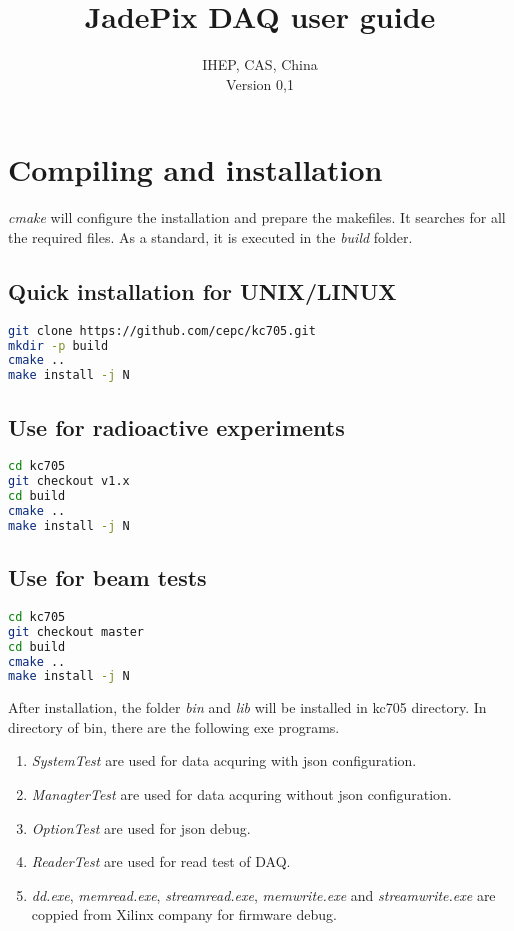 \documentclass[12pt,a4paper]{article}
\title{JadePix DAQ user guide}
\author{IHEP, CAS, China \\
	\small{Version 0,1}
}
\begin{document}
\maketitle

\newpage

\tableofcontents

\newpage

\section{Compiling and installation}
\label{compiling-and-installation}

\emph{cmake} will configure the installation and prepare the makefiles.
It searches for all the required files. As a standard, it is executed in
the \emph{build} folder.

\subsection{Quick installation for UNIX/LINUX}

\begin{lstlisting}[language=bash]
git clone https://github.com/cepc/kc705.git
mkdir -p build
cmake ..
make install -j N
\end{lstlisting}

\subsection{Use for radioactive experiments}
\label{use-for-radioactive-experiments}

\begin{lstlisting}[language=bash]
cd kc705 
git checkout v1.x
cd build
cmake ..
make install -j N
\end{lstlisting}

\subsection{Use for beam tests}
\label{use-for-beam-tests}

\begin{lstlisting}[language=Bash]
cd kc705 
git checkout master
cd build
cmake ..
make install -j N
\end{lstlisting}

After installation, the folder \emph{bin} and \emph{lib} will be installed in
kc705 directory. In directory of bin, there are the following exe programs.

\begin{enumerate}
	\item{\emph{SystemTest} are used for data acquring with json configuration.}
	\item{\emph{ManagterTest} are used for data acquring without json configuration.}
	\item{\emph{OptionTest} are used for json debug.}
	\item{\emph{ReaderTest} are used for read test of DAQ.}
	\item{\emph{dd.exe}, \emph{memread.exe}, \emph{streamread.exe}, \emph{memwrite.exe}
	      and \emph{streamwrite.exe} are coppied from Xilinx company for firmware debug.}
\end{enumerate}
\end{document}
